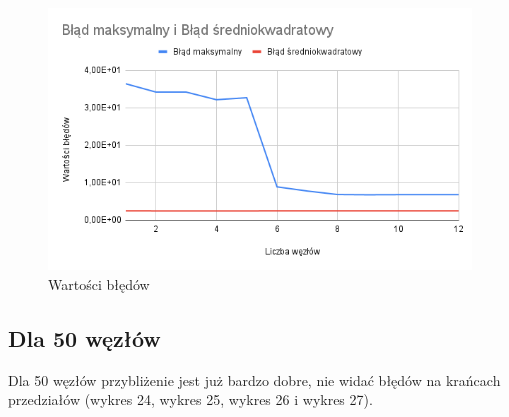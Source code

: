 \documentclass{article}
\begin{document}
\begin{figure}[H]
  \centering
  \begin{minipage}[b]{0.4\textwidth}
    \includegraphics[width=\textwidth]{img23.png}
    \caption{Wartości błędów}
  \end{minipage}
\end{figure}

\newpage

\subsection{Dla 50 węzłów}

\noindent
Dla 50 węzłów przybliżenie jest już bardzo dobre, nie widać błędów na krańcach przedziałów (wykres 24, wykres 25, wykres 26 i wykres 27).
\end{document}

